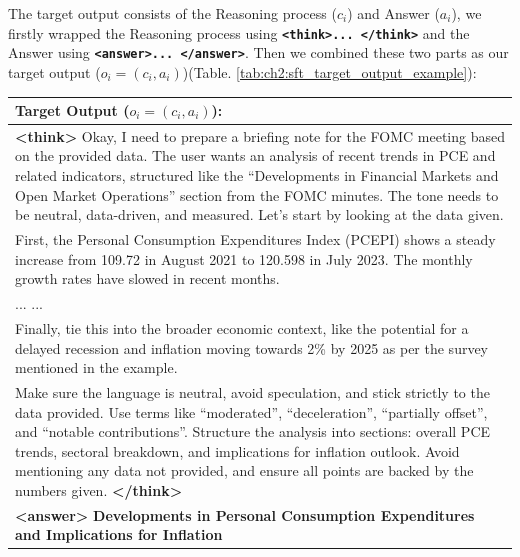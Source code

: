 The target output consists of the Reasoning process ($c_i$) and Answer ($a_i$), we firstly wrapped the Reasoning process using \textbf{\texttt{\textless think\textgreater ... \textless /think\textgreater}} and the Answer using \textbf{\texttt{\textless answer\textgreater ... \textless /answer\textgreater}}. Then we combined these two parts as our target output ($o_i = (c_i, a_i)$)(Table. \ref{tab:ch2:sft_target_output_example}):

\begin{table}[h]
    \centering
    \footnotesize
    \begin{tabular}{p{}}
    \toprule
    \textbf{Target Output ($o_i = (c_i, a_i)$):} \\
    \midrule
    \textbf{\textless think\textgreater} Okay, I need to prepare a briefing note for the FOMC meeting based on the provided data. The user wants an analysis of recent trends in PCE and related indicators, structured like the \textquotedblleft Developments in Financial Markets and Open Market Operations\textquotedblright{} section from the FOMC minutes. The tone needs to be neutral, data-driven, and measured. Let's start by looking at the data given. \\

    First, the Personal Consumption Expenditures Index (PCEPI) shows a steady increase from 109.72 in August 2021 to 120.598 in July 2023. The monthly growth rates have slowed in recent months. \\

    ... ... \\

    Finally, tie this into the broader economic context, like the potential for a delayed recession and inflation moving towards 2\% by 2025 as per the survey mentioned in the example. \\

    Make sure the language is neutral, avoid speculation, and stick strictly to the data provided. Use terms like ``moderated'', ``deceleration'', ``partially offset'', and ``notable contributions''. Structure the analysis into sections: overall PCE trends, sectoral breakdown, and implications for inflation outlook. Avoid mentioning any data not provided, and ensure all points are backed by the numbers given. \textbf{\textless /think\textgreater} \\[1ex]

    \textbf{\textless answer\textgreater} \textbf{Developments in Personal Consumption Expenditures and Implications for Inflation} \\


\end{tabular}
\end{table}
